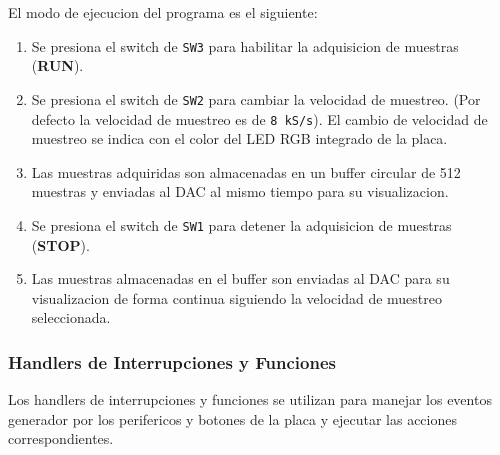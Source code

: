 \documentclass[11pt,a4paper]{article}
\begin{document}
El modo de ejecucion del programa es el siguiente:

\begin{enumerate}
    \item Se presiona el switch de \texttt{SW3} para habilitar la adquisicion de muestras
          (\textbf{RUN}).
    \item Se presiona el switch de \texttt{SW2} para cambiar la velocidad de muestreo.
          (Por defecto la velocidad de muestreo es de \texttt{8 kS/s}). El cambio de
          velocidad de muestreo se indica con el color del LED RGB integrado de la placa.
    \item Las muestras adquiridas son almacenadas en un buffer circular de 512 muestras y
          enviadas al DAC al mismo tiempo para su visualizacion.
    \item Se presiona el switch de \texttt{SW1} para detener la adquisicion de muestras
          (\textbf{STOP}).
    \item Las muestras almacenadas en el buffer son enviadas al DAC para su visualizacion
          de forma continua siguiendo la velocidad de muestreo seleccionada.
\end{enumerate}

\subsubsection{Handlers de Interrupciones y Funciones}

Los handlers de interrupciones y funciones se utilizan para manejar los eventos
generador por los perifericos y botones de la placa y ejecutar las acciones
correspondientes.
\end{document}
